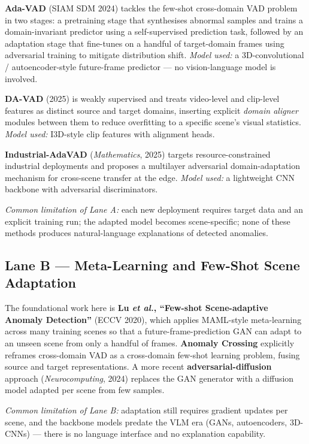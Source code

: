 \documentclass[12pt, a4paper]{article}
\begin{document}
\textbf{Ada-VAD} (SIAM SDM 2024) tackles the few-shot cross-domain VAD problem
in two stages: a pretraining stage that synthesises abnormal samples and
trains a domain-invariant predictor using a self-supervised prediction task,
followed by an adaptation stage that fine-tunes on a handful of target-domain
frames using adversarial training to mitigate distribution shift.
\textit{Model used:} a 3D-convolutional / autoencoder-style future-frame
predictor --- no vision-language model is involved.

\textbf{DA-VAD} (2025) is weakly supervised and treats video-level and
clip-level features as distinct source and target domains, inserting explicit
\textit{domain aligner} modules between them to reduce overfitting to a
specific scene's visual statistics. \textit{Model used:} I3D-style clip
features with alignment heads.

\textbf{Industrial-AdaVAD} (\textit{Mathematics}, 2025) targets
resource-constrained industrial deployments and proposes a multilayer
adversarial domain-adaptation mechanism for cross-scene transfer at the
edge. \textit{Model used:} a lightweight CNN backbone with adversarial
discriminators.

\textit{Common limitation of Lane A:} each new deployment requires target
data and an explicit training run; the adapted model becomes scene-specific;
none of these methods produces natural-language explanations of detected
anomalies.

\subsection{Lane B --- Meta-Learning and Few-Shot Scene Adaptation}

The foundational work here is \textbf{Lu \textit{et al.}, ``Few-shot
Scene-adaptive Anomaly Detection''} (ECCV 2020), which applies MAML-style
meta-learning across many training scenes so that a future-frame-prediction
GAN can adapt to an unseen scene from only a handful of frames.
\textbf{Anomaly Crossing} explicitly reframes cross-domain VAD as a
cross-domain few-shot learning problem, fusing source and target
representations. A more recent \textbf{adversarial-diffusion} approach
(\textit{Neurocomputing}, 2024) replaces the GAN generator with a diffusion
model adapted per scene from few samples.

\textit{Common limitation of Lane B:} adaptation still requires gradient
updates per scene, and the backbone models predate the VLM era (GANs,
autoencoders, 3D-CNNs) --- there is no language interface and no
explanation capability.
\end{document}
